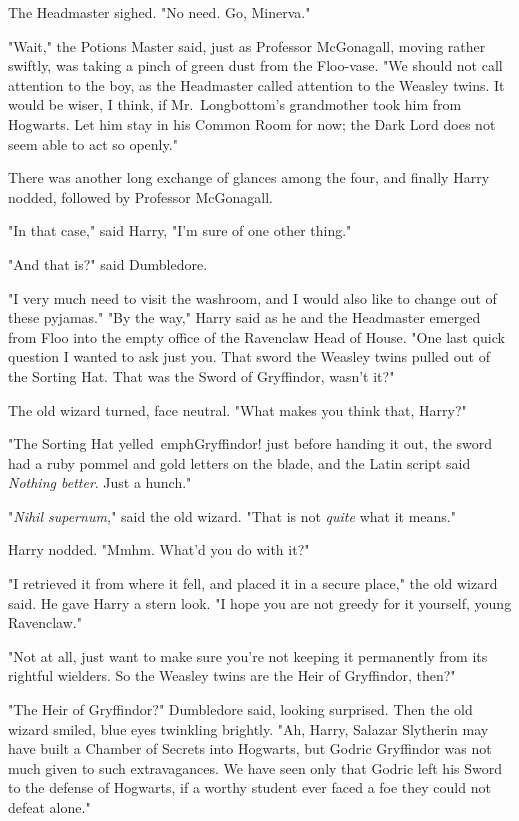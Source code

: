 The Headmaster sighed. "No need. Go, Minerva."

"Wait," the Potions Master said, just as Professor McGonagall, moving rather 
swiftly, was taking a pinch of green dust from the Floo-vase. "We should not 
call attention to the boy, as the Headmaster called attention to the Weasley 
twins. It would be wiser, I think, if Mr.~Longbottom's grandmother took him 
from Hogwarts. Let him stay in his Common Room for now; the Dark Lord does not 
seem able to act so openly."

There was another long exchange of glances among the four, and finally Harry 
nodded, followed by Professor McGonagall.

"In that case," said Harry, "I'm sure of one other thing."

"And that is?" said Dumbledore.

"I very much need to visit the washroom, and I would also like to change out of 
these pyjamas."
\sbreak
"By the way," Harry said as he and the Headmaster emerged from Floo into the 
empty office of the Ravenclaw Head of House. "One last quick question I wanted 
to ask just you. That sword the Weasley twins pulled out of the Sorting Hat. 
That was the Sword of Gryffindor, wasn't it?"

The old wizard turned, face neutral. "What makes you think that, Harry?"

"The Sorting Hat yelled\ emph{Gryffindor!} just before handing it out, the 
sword had a ruby pommel and gold letters on the blade, and the Latin script 
said \emph{Nothing better}. Just a hunch."

"\emph{Nihil supernum,}" said the old wizard. "That is not \emph{quite} what it 
means."

Harry nodded. "Mmhm. What'd you do with it?"

"I retrieved it from where it fell, and placed it in a secure place," the old 
wizard said. He gave Harry a stern look. "I hope you are not greedy for it 
yourself, young Ravenclaw."

"Not at all, just want to make sure you're not keeping it permanently from its 
rightful wielders. So the Weasley twins are the Heir of Gryffindor, then?"

"The Heir of Gryffindor?" Dumbledore said, looking surprised. Then the old 
wizard smiled, blue eyes twinkling brightly. "Ah, Harry, Salazar Slytherin may 
have built a Chamber of Secrets into Hogwarts, but Godric Gryffindor was not 
much given to such extravagances. We have seen only that Godric left his Sword 
to the defense of Hogwarts, if a worthy student ever faced a foe they could not 
defeat alone."

